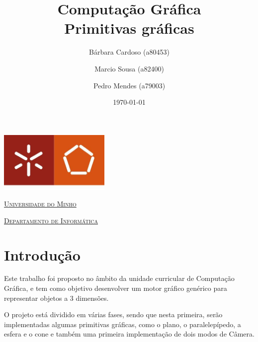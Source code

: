 \documentclass[a4paper]{article}
\begin{document}
\title{Computação Gráfica\\ Primitivas gráficas}
\author{Bárbara Cardoso (a80453) \and Marcio Sousa (a82400) \and Pedro Mendes (a79003)}
\date{\today}

\begin{titlepage}

    \thispagestyle{empty}
    \begin{center}
        \begin{minipage}{0.75\linewidth}
            \centering
            \includegraphics[width=0.4\textwidth]{eng.jpeg}\par\vspace{1cm}
            \vspace{1.5cm}
            \href{https://www.uminho.pt/PT}{\scshape\LARGE Universidade do Minho} \par
            \vspace{1cm}
            \href{https://www.di.uminho.pt/}{\scshape\Large Departamento de Informática} \par
            \vspace{1.5cm}

            \maketitle
        \end{minipage}
    \end{center}

\end{titlepage}

\tableofcontents

\pagebreak

\section{Introdução}
Este trabalho foi proposto no âmbito da unidade curricular de Computação Gráfica, e tem como objetivo desenvolver um motor gráfico genérico para representar objetos a 3 dimensões.

O projeto está dividido em várias fases, sendo que nesta primeira, serão implementadas algumas primitivas gráficas, como o plano, o paralelepípedo, a esfera e o cone e também uma primeira implementação de dois modos de Câmera.
\end{document}
